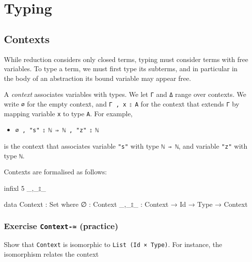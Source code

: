 \hypertarget{typing}{%
\section{Typing}\label{typing}}

\hypertarget{contexts}{%
\subsection{Contexts}\label{contexts}}

While reduction considers only closed terms, typing must consider terms
with free variables. To type a term, we must first type its subterms,
and in particular in the body of an abstraction its bound variable may
appear free.

A \emph{context} associates variables with types. We let \texttt{Γ} and
\texttt{Δ} range over contexts. We write \texttt{∅} for the empty
context, and \texttt{Γ\ ,\ x\ ⦂\ A} for the context that extends
\texttt{Γ} by mapping variable \texttt{x} to type \texttt{A}. For
example,

\begin{itemize}
\tightlist
\item
  \texttt{∅\ ,\ "s"\ ⦂\ \textasciigrave{}ℕ\ ⇒\ \textasciigrave{}ℕ\ ,\ "z"\ ⦂\ \textasciigrave{}ℕ}
\end{itemize}

is the context that associates variable \texttt{"s"} with type
\texttt{\textasciigrave{}ℕ\ ⇒\ \textasciigrave{}ℕ}, and variable
\texttt{"z"} with type \texttt{\textasciigrave{}ℕ}.

Contexts are formalised as follows:

\begin{fence}
\begin{code}
infixl 5  _,_⦂_

data Context : Set where
  ∅     : Context
  _,_⦂_ : Context → Id → Type → Context
\end{code}
\end{fence}

\hypertarget{exercise-context--practice}{%
\subsubsection{\texorpdfstring{Exercise \texttt{Context-≃}
(practice)}{Exercise Context-≃ (practice)}}\label{exercise-context--practice}}

Show that \texttt{Context} is isomorphic to
\texttt{List\ (Id\ ×\ Type)}. For instance, the isomorphism relates the
context

